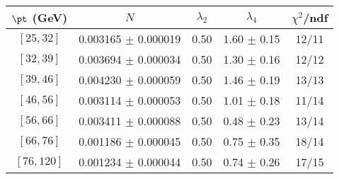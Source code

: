 \begin{tabular}{c||c|c|c|c}
$\pt$ (GeV) & $N$ & $\lambda_{2}$ & $\lambda_4$  & $\chi^2$/ndf  \\
\hline
$[25, 32]$ & 0.003165 $\pm$ 0.000019 & 0.50 & 1.60 $\pm$ 0.15 & 12/11\\
$[32, 39]$ & 0.003694 $\pm$ 0.000034 & 0.50 & 1.30 $\pm$ 0.16 & 12/12\\
$[39, 46]$ & 0.004230 $\pm$ 0.000059 & 0.50 & 1.46 $\pm$ 0.19 & 13/13\\
$[46, 56]$ & 0.003114 $\pm$ 0.000053 & 0.50 & 1.01 $\pm$ 0.18 & 11/14\\
$[56, 66]$ & 0.003411 $\pm$ 0.000088 & 0.50 & 0.48 $\pm$ 0.23 & 13/14\\
$[66, 76]$ & 0.001186 $\pm$ 0.000045 & 0.50 & 0.75 $\pm$ 0.35 & 18/14\\
$[76, 120]$ & 0.001234 $\pm$ 0.000044 & 0.50 & 0.74 $\pm$ 0.26 & 17/15\\
\end{tabular}
